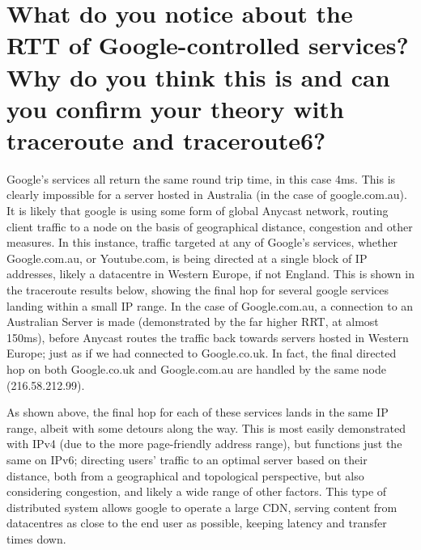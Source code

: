 \section{What do you notice about the RTT of Google-controlled services? Why do you think this is and can you confirm your theory with traceroute and traceroute6?}
\begin{normalsize}
Google's services all return the same round trip time, in this case 4ms. This is clearly impossible for a server hosted in Australia (in the case of google.com.au). It is likely that google is using some form of global Anycast network, routing client traffic to a node on the basis of geographical distance, congestion and other measures. In this instance, traffic targeted at any of Google's services, whether Google.com.au, or Youtube.com, is being directed at a single block of IP addresses, likely a datacentre in Western Europe, if not England. This is shown in the traceroute results below, showing the final hop for several google services landing within a small IP range. In the case of Google.com.au, a connection to an Australian Server is made (demonstrated by the far higher RRT, at almost 150ms), before Anycast routes the traffic back towards servers hosted in Western Europe; just as if we had connected to Google.co.uk. In fact, the final directed hop on both Google.co.uk and Google.com.au are handled by the same node (216.58.212.99). 
\end{normalsize}

\begin{normalsize}
As shown above, the final hop for each of these services lands in the same IP range, albeit with some detours along the way. This is most easily demonstrated with IPv4 (due to the more page-friendly address range), but functions just the same on IPv6; directing users' traffic to an optimal server based on their distance, both from a geographical and topological perspective, but also considering congestion, and likely a wide range of other factors. This type of distributed system allows google to operate a large CDN, serving content from datacentres as close to the end user as possible, keeping latency and transfer times down.\\

\end{normalsize}
\newpage
